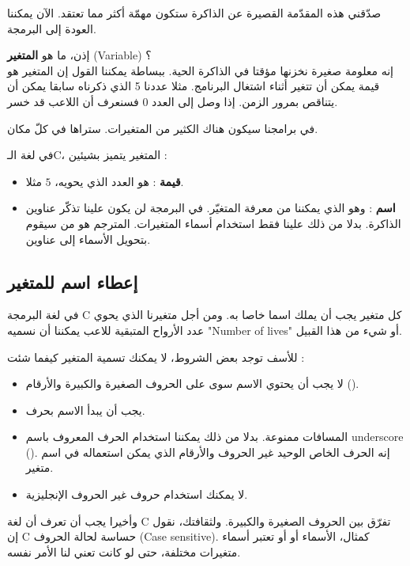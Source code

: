 صدّقني هذه المقدّمة القصيرة عن الذاكرة ستكون مهمّة أكثر مما تعتقد. الآن يمكننا العودة إلى البرمجة.

إذن، ما هو
\textbf{المتغير}
(\textenglish{Variable}) ؟\\
إنه معلومة صغيرة نخزنها مؤقتا في الذاكرة الحية. ببساطة يمكننا القول إن المتغير هو قيمة يمكن أن تتغير أثناء اشتغال البرنامج. مثلا عددنا 5 الذي ذكرناه سابقا يمكن أن يتناقص بمرور الزمن. إذا وصل إلى العدد 0 فسنعرف أن اللاعب قد خسر.

في برامجنا سيكون هناك الكثير من المتغيرات. ستراها في كلّ مكان.

في لغة الـ\textenglish{C}،
 المتغير يتميز بشيئين :

\begin{itemize}
  \item \textbf{قيمة}
: هو العدد الذي يحويه، $ 5 $ مثلا.
  \item \textbf{اسم}
: وهو الذي يمكننا من معرفة المتغيّر. في البرمجة لن يكون علينا تذكّر عناوين الذاكرة. بدلا من ذلك علينا فقط استخدام أسماء المتغيرات. المترجم هو من سيقوم بتحويل الأسماء إلى عناوين.
\end{itemize}

\subsection{إعطاء اسم للمتغير}

في لغة البرمجة
\textenglish{C}
كل متغير يجب أن يملك اسما خاصا به. ومن أجل متغيرنا الذي يحوي عدد الأرواح المتبقية للاعب يمكننا أن نسميه
"\textenglish{Number of lives}"
أو شيء من هذا القبيل.

للأسف توجد بعض الشروط، لا يمكنك تسمية المتغير كيفما شئت :

\begin{itemize}
  \item لا يجب أن يحتوي الاسم سوى على الحروف الصغيرة والكبيرة والأرقام
().
  \item يجب أن يبدأ الاسم بحرف.
  \item المسافات ممنوعة. بدلا من ذلك يمكننا استخدام الحرف المعروف باسم
\textenglish{underscore}
 (\InlineCode{\_}).
إنه الحرف الخاص الوحيد غير الحروف والأرقام الذي يمكن استعماله في اسم متغير.
  \item لا يمكنك استخدام حروف غير الحروف الإنجليزية.
\end{itemize}

وأخيرا يجب أن تعرف أن لغة
\textenglish{C}
 تفرّق بين الحروف الصغيرة والكبيرة. ولثقافتك، نقول إن
\textenglish{C}
 حساسة لحالة الحروف
(\textenglish{Case sensitive}).
كمثال، الأسماء
 أو
 أو
تعتبر أسماء متغيرات مختلفة، حتى لو كانت تعني لنا الأمر نفسه.

